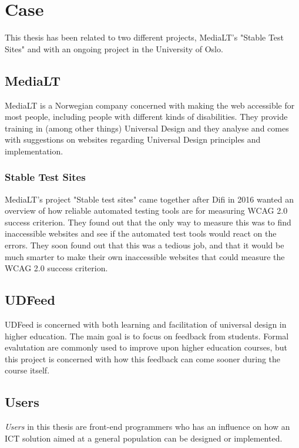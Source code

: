 \chapter{Case}
This thesis has been related to two different projects, MediaLT's "Stable Test Sites" and with an ongoing project in the University of Oslo.
\section{MediaLT}
MediaLT is a Norwegian company concerned with making the web accessible for most people, including people with different kinds of disabilities. They provide training in (among other things) Universal Design and they analyse and comes with suggestions on websites regarding Universal Design principles and implementation.

\subsection{Stable Test Sites}
MediaLT's project "Stable test sites" came together after Difi in 2016 wanted an overview of how reliable automated testing tools are for measuring WCAG 2.0 success criterion. They found out that the only way to measure this was to find inaccessible websites and see if the automated test tools would react on the errors. They soon found out that this was a tedious job, and that it would be much smarter to make their own inaccessible websites that could measure the WCAG 2.0 success criterion.
\section{UDFeed}
UDFeed is concerned with both learning and facilitation of universal design in higher education. The main goal is to focus on feedback from students. Formal evalutation are commonly used to improve upon higher education courses, but this project is concerned with how this feedback can come sooner during the course itself.



\section{Users}
\textit{Users} in this thesis are front-end programmers who has an influence on how an ICT solution aimed at a general population can be designed or implemented. 


